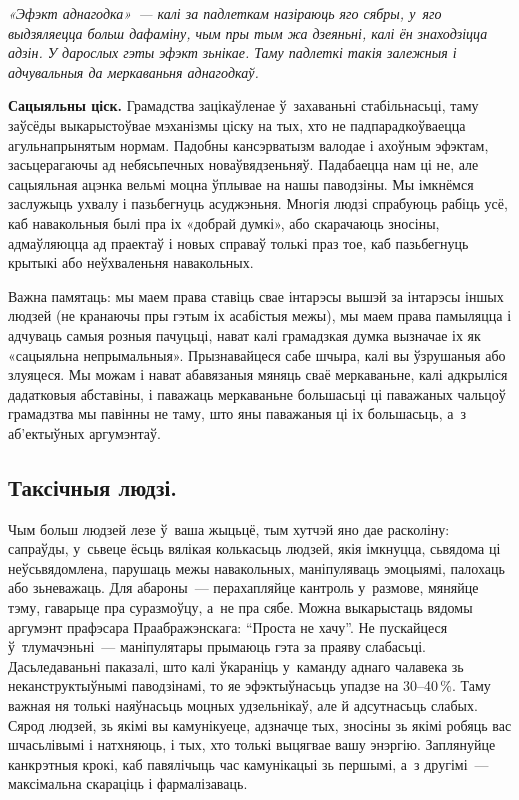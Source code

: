 \emph{«Эфэкт аднагодка»~--- калі за падлеткам назіраюць яго сябры, у~яго выдзяляецца больш дафаміну, чым пры тым жа дзеяньні, калі ён знаходзіцца адзін. У дарослых гэты эфэкт зьнікае. Таму падлеткі такія залежныя і адчувальныя да меркаваньня аднагодкаў.}

\textbf{Сацыяльны ціск.} Грамадства зацікаўленае ў~захаваньні стабільнасьці, таму заўсёды выкарыстоўвае мэханізмы ціску на тых, хто не падпарадкоўваецца агульнапрынятым нормам. Падобны кансэрватызм валодае і ахоўным эфэктам, засьцерагаючы ад небясьпечных новаўвядзеньняў. Падабаецца нам ці не, але сацыяльная ацэнка вельмі моцна ўплывае на нашы паводзіны. Мы імкнёмся заслужыць ухвалу і пазьбегнуць асуджэньня. Многія людзі спрабуюць рабіць усё, каб навакольныя былі пра іх «добрай думкі», або скарачаюць зносіны, адмаўляюцца ад праектаў і новых справаў толькі праз тое, каб пазьбегнуць крытыкі або неўхваленьня навакольных.

Важна памятаць: мы маем права ставіць свае інтарэсы вышэй за інтарэсы іншых людзей (не кранаючы пры гэтым іх асабістыя межы), мы маем права памыляцца і адчуваць самыя розныя пачуцьці, нават калі грамадзкая думка вызначае іх як «сацыяльна непрымальныя». Прызнавайцеся сабе шчыра, калі вы ўзрушаныя або злуяцеся. Мы можам і нават абавязаныя мяняць сваё меркаваньне, калі адкрыліся дадатковыя абставіны, і паважаць меркаваньне большасьці ці паважаных чальцоў грамадзтва мы павінны не таму, што яны паважаныя ці іх большасьць, а~з аб'ектыўных аргумэнтаў.

\subsection*{Таксічныя людзі.}

Чым больш людзей лезе ў~ваша жыцьцё, тым хутчэй яно дае расколіну: сапраўды, у~сьвеце ёсьць вялікая колькасьць людзей, якія імкнуцца, сьвядома ці неўсьвядомлена, парушаць межы навакольных, маніпуляваць эмоцыямі, палохаць або зьневажаць. Для абароны~--- перахапляйце кантроль у~размове, мяняйце тэму, гаварыце пра суразмоўцу, а~не пра сябе. Можна выкарыстаць вядомы аргумэнт прафэсара Праабражэнскага: ``Проста не хачу''. Не пускайцеся ў~тлумачэньні~--- маніпулятары прымаюць гэта за праяву слабасьці. Дасьледаваньні паказалі, што калі ўкараніць у~каманду аднаго чалавека зь неканструктыўнымі паводзінамі, то яе эфэктыўнасьць упадзе на 30--40\,\%. Таму важная ня толькі наяўнасьць моцных удзельнікаў, але й адсутнасьць слабых. Сярод людзей, зь якімі вы камунікуеце, адзначце тых, зносіны зь якімі робяць вас шчасьлівымі і натхняюць, і тых, хто толькі выцягвае вашу энэргію. Заплянуйце канкрэтныя крокі, каб павялічыць час камунікацыі зь першымі, а~з другімі~--- максімальна скараціць і фармалізаваць.

